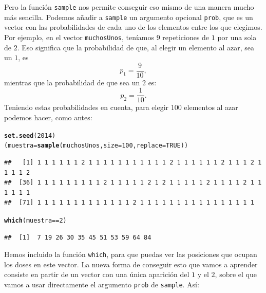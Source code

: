 \documentclass[10pt,a4paper]{article}\usepackage[]{graphicx}\usepackage[]{color}
\makeatletter
\newcommand{\hlnum}[1]{\textcolor[rgb]{0.686,0.059,0.569}{#1}}%
\newcommand{\hlopt}[1]{\textcolor[rgb]{0,0,0}{#1}}%
\newcommand{\hlstd}[1]{\textcolor[rgb]{0.345,0.345,0.345}{#1}}%
\newcommand{\hlkwb}[1]{\textcolor[rgb]{0.69,0.353,0.396}{#1}}%
\newcommand{\hlkwc}[1]{\textcolor[rgb]{0.333,0.667,0.333}{#1}}%
\newcommand{\hlkwd}[1]{\textcolor[rgb]{0.737,0.353,0.396}{\textbf{#1}}}%
\newenvironment{kframe}{%
 \def\at@end@of@kframe{}%
 \ifinner\ifhmode%
  \def\at@end@of@kframe{\end{minipage}}%
  \begin{minipage}{\columnwidth}%
 \fi\fi%
 \def\FrameCommand##1{\hskip\@totalleftmargin \hskip-\fboxsep
 \colorbox{shadecolor}{##1}\hskip-\fboxsep
     \hskip-\linewidth \hskip-\@totalleftmargin \hskip\columnwidth}%
 \MakeFramed {\advance\hsize-\width
   \@totalleftmargin\z@ \linewidth\hsize
   \@setminipage}}%
 {\par\unskip\endMakeFramed%
 \at@end@of@kframe}
\newenvironment{knitrout}{}{} %
\makeatother
\begin{document}
Pero la función {\tt sample} nos permite conseguir eso mismo de una manera mucho más sencilla. Podemos añadir a {\tt sample} un argumento opcional {\tt prob}, que es un vector con las probabilidades de cada uno de los elementos entre los que elegimos. Por ejemplo, en el vector {\tt muchosUnos}, teníamos $9$ repeticiones de $1$ por una sola de $2$. Eso significa que la probabilidad de que, al elegir un elemento al azar, sea un $1$, es
\[p_1=\dfrac{9}{10},\]
mientras que la probabilidad de que sea un $2$ es:
     \[p_2=\dfrac{1}{10}.\]
Teniendo estas probabilidades en cuenta, para elegir 100 elementos al azar podemos hacer, como antes:
\begin{knitrout}
\color{fgcolor}\begin{kframe}
\begin{alltt}
\hlkwd{set.seed}\hlstd{(}\hlnum{2014}\hlstd{)}
\hlstd{(muestra} \hlkwb{=} \hlkwd{sample}\hlstd{(muchosUnos,} \hlkwc{size}\hlstd{=}\hlnum{100}\hlstd{,} \hlkwc{replace}\hlstd{=}\hlnum{TRUE}\hlstd{) )}
\end{alltt}
\begin{verbatim}
##   [1] 1 1 1 1 1 1 2 1 1 1 1 1 1 1 1 1 1 1 2 1 1 1 1 1 1 2 1 1 1 2 1 1 1 1 2
##  [36] 1 1 1 1 1 1 1 1 1 2 1 1 1 1 1 2 1 2 1 1 1 1 1 2 1 1 1 1 2 1 1 1 1 1 1
##  [71] 1 1 1 1 1 1 1 1 1 1 1 1 1 2 1 1 1 1 1 1 1 1 1 1 1 1 1 1 1 1
\end{verbatim}
\begin{alltt}
\hlkwd{which}\hlstd{(muestra}\hlopt{==}\hlnum{2}\hlstd{)}
\end{alltt}
\begin{verbatim}
##  [1]  7 19 26 30 35 45 51 53 59 64 84
\end{verbatim}
\end{kframe}
\end{knitrout}
     Hemos incluido la función {\tt which}, para que puedas ver las posiciones que ocupan los doses en este vector. La nueva forma de conseguir esto que vamos a aprender consiste en partir de un vector con una única aparición del $1$ y el $2$, sobre el que vamos a usar directamente el argumento {\tt prob} de {\tt sample}. Así:
\end{document}
